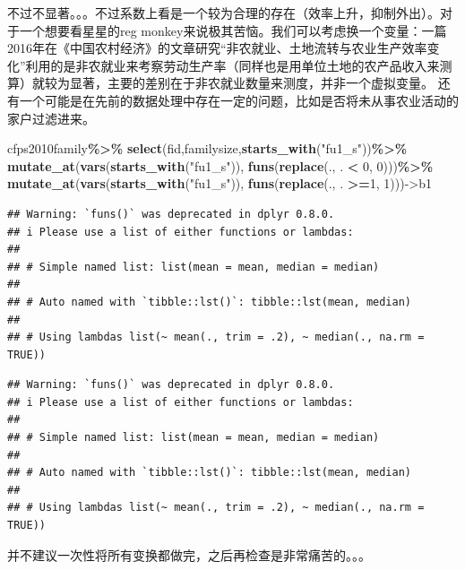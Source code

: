 \documentclass[
  oneside]{book}
\newenvironment{Shaded}{\begin{snugshade}}{\end{snugshade}}
\newcommand{\DecValTok}[1]{\textcolor[rgb]{0.00,0.00,0.81}{#1}}
\newcommand{\FunctionTok}[1]{\textcolor[rgb]{0.13,0.29,0.53}{\textbf{#1}}}
\newcommand{\NormalTok}[1]{#1}
\newcommand{\OtherTok}[1]{\textcolor[rgb]{0.56,0.35,0.01}{#1}}
\newcommand{\SpecialCharTok}[1]{\textcolor[rgb]{0.81,0.36,0.00}{\textbf{#1}}}
\newcommand{\StringTok}[1]{\textcolor[rgb]{0.31,0.60,0.02}{#1}}
\begin{document}
不过不显著。。。不过系数上看是一个较为合理的存在（效率上升，抑制外出）。对于一个想要看星星的reg monkey来说极其苦恼。我们可以考虑换一个变量：一篇2016年在《中国农村经济》的文章研究``非农就业、土地流转与农业生产效率变化''利用的是非农就业来考察劳动生产率（同样也是用单位土地的农产品收入来测算）就较为显著，主要的差别在于非农就业数量来测度，并非一个虚拟变量。
还有一个可能是在先前的数据处理中存在一定的问题，比如是否将未从事农业活动的家户过滤进来。

\begin{Shaded}
\begin{Highlighting}[]
\NormalTok{cfps2010family}\SpecialCharTok{\%\textgreater{}\%}
  \FunctionTok{select}\NormalTok{(fid,familysize,}\FunctionTok{starts\_with}\NormalTok{(}\StringTok{"fu1\_s"}\NormalTok{))}\SpecialCharTok{\%\textgreater{}\%}
  \FunctionTok{mutate\_at}\NormalTok{(}\FunctionTok{vars}\NormalTok{(}\FunctionTok{starts\_with}\NormalTok{(}\StringTok{"fu1\_s"}\NormalTok{)), }\FunctionTok{funs}\NormalTok{(}\FunctionTok{replace}\NormalTok{(., . }\SpecialCharTok{\textless{}} \DecValTok{0}\NormalTok{, }\DecValTok{0}\NormalTok{)))}\SpecialCharTok{\%\textgreater{}\%}
  \FunctionTok{mutate\_at}\NormalTok{(}\FunctionTok{vars}\NormalTok{(}\FunctionTok{starts\_with}\NormalTok{(}\StringTok{"fu1\_s"}\NormalTok{)), }\FunctionTok{funs}\NormalTok{(}\FunctionTok{replace}\NormalTok{(., . }\SpecialCharTok{\textgreater{}=}\DecValTok{1}\NormalTok{, }\DecValTok{1}\NormalTok{)))}\OtherTok{{-}\textgreater{}}\NormalTok{b1}
\end{Highlighting}
\end{Shaded}

\begin{verbatim}
## Warning: `funs()` was deprecated in dplyr 0.8.0.
## i Please use a list of either functions or lambdas:
## 
## # Simple named list: list(mean = mean, median = median)
## 
## # Auto named with `tibble::lst()`: tibble::lst(mean, median)
## 
## # Using lambdas list(~ mean(., trim = .2), ~ median(., na.rm = TRUE))
\end{verbatim}

\begin{verbatim}
## Warning: `funs()` was deprecated in dplyr 0.8.0.
## i Please use a list of either functions or lambdas:
## 
## # Simple named list: list(mean = mean, median = median)
## 
## # Auto named with `tibble::lst()`: tibble::lst(mean, median)
## 
## # Using lambdas list(~ mean(., trim = .2), ~ median(., na.rm = TRUE))
\end{verbatim}

并不建议一次性将所有变换都做完，之后再检查是非常痛苦的。。。
\end{document}
